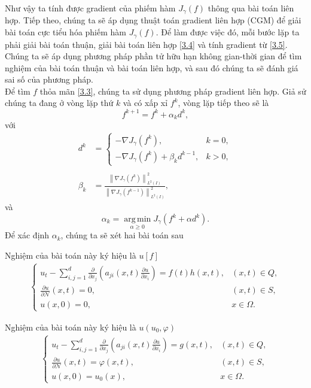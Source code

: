 \documentclass[]{article}
\begin{document}
\noindent Như vậy ta tính được gradient của phiếm hàm $J_\gamma(f)$ thông qua bài toán liên hợp. Tiếp theo, chúng ta sẽ áp dụng thuật toán gradient liên hợp (CGM) để giải bài toán cực tiểu hóa phiếm hàm $J_\gamma(f)$. Để làm được việc đó, mỗi bước lặp ta phải giải bài toán thuận, giải bài toán liên hợp \eqref{3.4} và tính gradient từ \eqref{3.5}. Chúng ta sẽ áp dụng phương pháp phần tử hữu hạn không gian-thời gian để tìm nghiệm của bài toán thuận và bài toán liên hợp, và sau đó chúng ta sẽ đánh giá sai số của phương pháp.\\
Để tìm $f$ thỏa mãn \eqref{3.3}, chúng ta sử dụng phương pháp gradient liên hợp. Giả sử chúng ta đang ở vòng lặp thứ $k$ và có xấp xỉ $f^k$, vòng lặp tiếp theo sẽ là
$$f^{k+1}=f^k+\alpha_kd^k,$$
với
\begin{align*}
	d^k&=\left\{\begin{array}{ll}
	-\nabla J_\gamma(f^k),& k=0,\\
	-\nabla J_\gamma(f^k)+\beta_kd^{k-1},& k>0,
	\end{array}\right.\\\\
	\beta_k&=\frac{\left\|\nabla J_\gamma (f^k)\right\|^2_{L^2(I)}}{\left\|\nabla J_\gamma (f^{k-1})\right\|^2_{L^2(I)}},
\end{align*}
và
$$\alpha_k=\operatorname*{arg\,min}_{\alpha\geq 0}J_\gamma(f^k+\alpha d^k).$$
Để xác định $\alpha_k$, chúng ta sẽ xét hai bài toán sau
\begin{bt}\label{bt3.1}
	Nghiệm của bài toán này ký hiệu là $u[f]$
	\begin{align*}
		\begin{cases}
			u_t-\sum_{i, j=1}^{d}\frac{\partial}{\partial x_j}\left(a_{ji}(x, t)\frac{\partial u}{\partial x_i}\right)=f(t)h(x, t),&(x, t)\in Q,\\
			\frac{\partial u}{\partial \mathcal{N}}(x, t)=0, & (x, t)\in S,\\
			u(x, 0)=0,&x\in \Omega.
		\end{cases}
	\end{align*}
\end{bt}
\begin{bt}\label{bt3.2}
	Nghiệm của bài toán này ký hiệu là $u(u_0, \varphi)$
	\begin{align*}
		\begin{cases}
			u_t-\sum_{i, j=1}^{d}\frac{\partial}{\partial x_j}\left(a_{ji}(x, t)\frac{\partial u}{\partial x_i}\right)=g(x, t),&(x, t)\in Q,\\
			\frac{\partial u}{\partial \mathcal{N}}(x, t)=\varphi(x, t), & (x, t)\in S,\\
			u(x, 0)=u_0(x),&x\in \Omega.
		\end{cases}
	\end{align*}
\end{bt}
\end{document}
